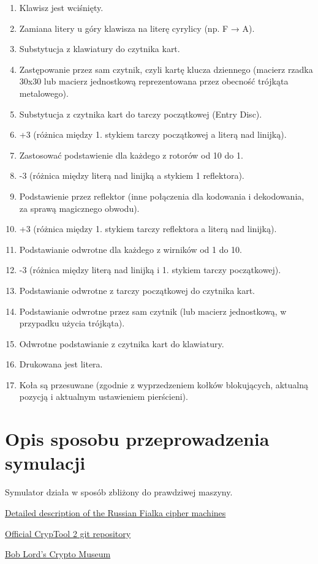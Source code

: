 \documentclass{article}
\begin{document}
\begin{enumerate}
    \item Klawisz jest wciśnięty.
    \item Zamiana litery u góry klawisza na literę cyrylicy (np. F → A).
    \item Substytucja z klawiatury do czytnika kart.
    \item Zastępowanie przez sam czytnik, czyli kartę klucza dziennego (macierz rzadka 30x30 lub macierz jednostkową reprezentowana przez obecność trójkąta metalowego).
    \item Substytucja z czytnika kart do tarczy początkowej (Entry Disc).
    \item +3 (różnica między 1. stykiem tarczy początkowej a literą nad linijką).
    \item Zastosować podstawienie dla każdego z rotorów od 10 do 1.
    \item -3 (różnica między literą nad linijką a stykiem 1 reflektora).
    \item Podstawienie przez reflektor (inne połączenia dla kodowania i dekodowania, za sprawą magicznego obwodu).
    \item +3 (różnica między 1. stykiem tarczy reflektora a literą nad linijką).
    \item Podstawianie odwrotne dla każdego z wirników od 1 do 10.
    \item -3 (różnica między literą nad linijką i 1. stykiem tarczy początkowej).
    \item Podstawianie odwrotne z tarczy początkowej do czytnika kart.
    \item Podstawianie odwrotne przez sam czytnik (lub macierz jednostkową, w przypadku użycia trójkąta).
    \item Odwrotne podstawianie z czytnika kart do klawiatury.
    \item Drukowana jest litera.
    \item Koła są przesuwane (zgodnie z wyprzedzeniem kołków blokujących, aktualną pozycją i aktualnym ustawieniem pierścieni).
\end{enumerate}

\section{Opis sposobu przeprowadzenia symulacji}

Symulator działa w sposób zbliżony do prawdziwej maszyny.




\href{https://www.cryptomuseum.com/pub/files/Fialka_200.pdf}{Detailed description of the Russian Fialka cipher machines}

\href{https://github.com/CrypToolProject/CrypTool-2}{Official CrypTool 2 git repository}

\href{https://www.ilord.com/fialka}{Bob Lord's Crypto Museum}
\end{document}
